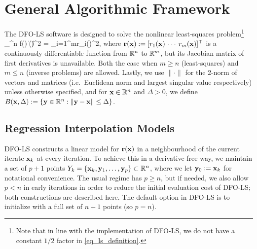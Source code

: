 \section{General Algorithmic Framework} \label{sec_algo_framework}
The DFO-LS software is designed to solve the nonlinear least-squares problem\footnote{\:Note that in line with the implementation of DFO-LS, we do not have a constant $1/2$ factor in \eqref{eq_ls_definition}.}
\be \min_{\bx\in\R^n}\: f(\bx)  \|\br(\bx)\|^2 = \sum_{i=1}^{m}r_i(\bx)^2, \label{eq_ls_definition} \ee
where $\mathbf{r}(\mathbf{x}) := [r_1(\mathbf{x}) \: \cdots \: r_m(\mathbf{x})]^{\top}$ is a continuously differentiable function from $\mathbb{R}^n$ to $\mathbb{R}^m$, but its Jacobian matrix of first derivatives is unavailable. Both the case when $m\geq n$ (least-squares) and $m\leq n$ (inverse problems) are allowed.
Lastly, we use $\|\cdot\|$ for the 2-norm of vectors and matrices (i.e.~Euclidean norm and largest singular value respectively) unless otherwise specified, and for $\mathbf{x}\in\mathbb{R}^n$ and $\Delta>0$, we define $B(\mathbf{x},\Delta):=\{\mathbf{y}\in\mathbb{R}^n : \|\mathbf{y}-\mathbf{x}\|\leq\Delta\}$.

\subsection{Regression Interpolation Models} \label{sec_regression_models}
DFO-LS constructs a linear model for $\mathbf{r}(\mathbf{x})$ in a neighbourhood of the current iterate $\mathbf{x}_k$ at every iteration.
To achieve this in a derivative-free way, we maintain a set of $p+1$ points $Y_k=\{\mathbf{x}_k, \mathbf{y}_1, \ldots, \mathbf{y}_p\}\subset\mathbb{R}^n$, where we let $\mathbf{y}_0:= \mathbf{x}_k$ for notational convenience.
The usual regime has $p\geq n$, but if needed, we also allow $p<n$ in early iterations in order to reduce the initial evaluation cost of DFO-LS; both constructions are described here. The default option in DFO-LS is to initialize with a full set of $n+1$ points (so $p=n$).




